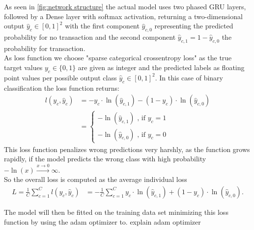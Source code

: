 As seen in \ref{fig:network structure} the actual model uses two phased GRU layers, followed by a Dense layer with softmax activation, returning a two-dimensional output $\hat{y}_c \in [0,1]^2$ with the first component $\hat{y}_{c,0}$ representing the predicted probability for no transaction and the second component  $\hat{y}_{c,1} = 1 - \hat{y}_{c,0}$ the probability for transaction.\\
As loss function we choose "sparse categorical crossentropy loss" as the true target values $y_c\in \{0,1\}$ are given as integer and the predicted labels as floating point values per possible output class $\hat{y}_c\in[0,1]^2$.  
In this case of binary classification the loss function returns:
\begin{align*}
    l(y_c, \hat{y}_c) &= - y_c \cdot \ln{(\hat{y}_{c,1})} - (1 - y_c) \cdot \ln{(\hat{y}_{c,0})}\\
&= \begin{cases}
     -\ln{(\hat{y}_{c,1})} \textrm{ , \ if } y_c=1 \\
     -\ln{(\hat{y}_{c,0})}  \textrm{ , \ if } y_c=0
\end{cases}
\end{align*}
This loss function penalizes wrong predictions very  harshly, as the function grows rapidly, if the model predicts the wrong class with high probability $-\ln(x) \xrightarrow{x\rightarrow 0} \infty $.\\
So the overall loss is computed as the average individual loss
\begin{align*}
    L = \frac{1}{C}\sum_{c=1}^C  l(y_c, \hat{y}_c) &= -\frac{1}{C}\sum_{c=1}^C  y_c \cdot \ln{(\hat{y}_{c,1})} +(1 - y_c) \cdot \ln{(\hat{y}_{c,0})}.
\end{align*}

The model will then be fitted on the training data set minimizing this loss function by using the adam optimizer to.
\color{red} explain adam optimizer \color{black}

